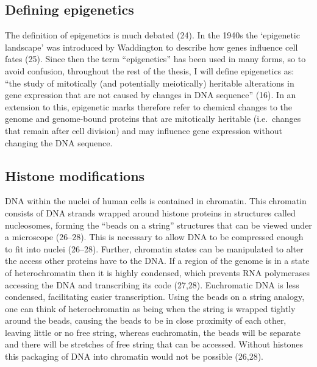 \documentclass[11pt,oneside]{bristolthesis}
\begin{document}
\hypertarget{defining-epigenetics}{%
\subsection{Defining epigenetics}\label{defining-epigenetics}}

The definition of epigenetics is much debated (24). In the 1940s the `epigenetic landscape' was introduced by Waddington to describe how genes influence cell fates (25). Since then the term ``epigenetics'' has been used in many forms, so to avoid confusion, throughout the rest of the thesis, I will define epigenetics as: ``the study of mitotically (and potentially meiotically) heritable alterations in gene expression that are not caused by changes in DNA sequence'' (16). In an extension to this, epigenetic marks therefore refer to chemical changes to the genome and genome-bound proteins that are mitotically heritable (i.e.~changes that remain after cell division) and may influence gene expression without changing the DNA sequence.

\hypertarget{histone-modifications}{%
\subsection{Histone modifications}\label{histone-modifications}}

DNA within the nuclei of human cells is contained in chromatin. This chromatin consists of DNA strands wrapped around histone proteins in structures called nucleosomes, forming the ``beads on a string'' structures that can be viewed under a microscope (26--28). This is necessary to allow DNA to be compressed enough to fit into nuclei (26--28). Further, chromatin states can be manipulated to alter the access other proteins have to the DNA. If a region of the genome is in a state of heterochromatin then it is highly condensed, which prevents RNA polymerases accessing the DNA and transcribing its code (27,28). Euchromatic DNA is less condensed, facilitating easier transcription. Using the beads on a string analogy, one can think of heterochromatin as being when the string is wrapped tightly around the beads, causing the beads to be in close proximity of each other, leaving little or no free string, whereas euchromatin, the beads will be separate and there will be stretches of free string that can be accessed. Without histones this packaging of DNA into chromatin would not be possible (26,28).
\end{document}
